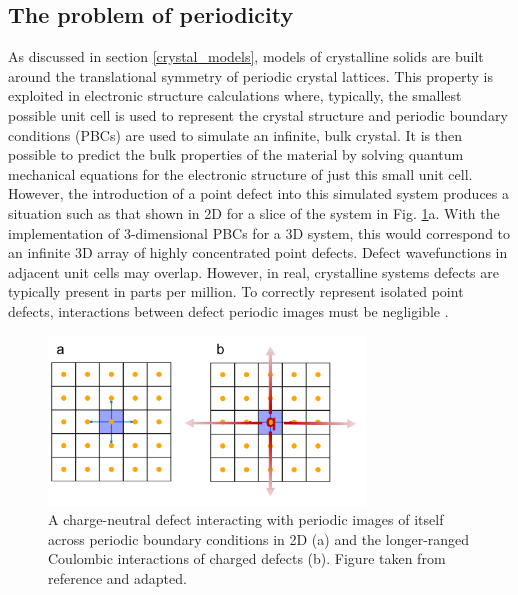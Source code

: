 \documentclass[11pt, twoside]{report}
\begin{document}
\subsection{The problem of periodicity}
As discussed in section \ref{crystal_models}, models of crystalline solids are built around the translational symmetry of periodic crystal lattices. This property is exploited in electronic structure calculations where, typically, the smallest possible unit cell is used to represent the crystal structure and periodic boundary conditions (PBCs) are used to simulate an infinite, bulk crystal. It is then possible to predict the bulk properties of the material by solving quantum mechanical equations for the electronic structure of just this small unit cell. However, the introduction of a point defect into this simulated system produces a situation such as that shown in 2D for a slice of the system in Fig. \ref{defect_PBCs}a. With the implementation of 3-dimensional PBCs for a 3D system, this would correspond to an infinite 3D array of highly concentrated point defects. Defect wavefunctions in adjacent unit cells may overlap. However, in real, crystalline systems defects are typically present in parts per million.  To correctly represent isolated point defects, interactions between defect periodic images must be negligible \cite{freysoldt_rev}.

\begin{figure}[h!]
  \centering
    \includegraphics[width=0.75\textwidth]{figures/ase_defects.png}
    \caption[A charge-neutral defect interacting with periodic images of itself across periodic boundary conditions in 2D (a) and the longer-ranged Coulombic interactions of charged defects (b).]{A charge-neutral defect interacting with periodic images of itself across periodic boundary conditions in 2D (a) and the longer-ranged Coulombic interactions of charged defects (b). Figure taken from reference  and adapted.}
  \label{defect_PBCs}
\end{figure}
\end{document}
